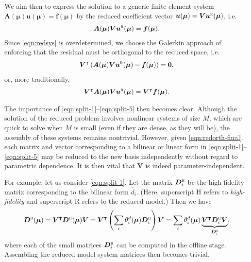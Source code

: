 \documentclass[onecolumn, twoside, a4paper, 11pt]{article}
\begin{document}
We aim then to express the solution to a generic finite element system
$\bm A(\bm \mu) \bm u(\bm \mu) = \bm f(\bm \mu)$ by the reduced
coefficient vector $\bm u(\bm \mu) = \bm V \bm u^\textsc{r}(\bm \mu)$, i.e.
\begin{equation}
  \label{eqn:redsys}
  \bm A(\bm \mu) \bm V \bm u^\textsc{r}(\bm \mu) = \bm f(\bm \mu).
\end{equation}
Since \eqref{eqn:redsys} is overdetermined, we choose the Galerkin
approach of enforcing that the residual must be orthogonal to the
reduced space, i.e.
\begin{equation}
  \label{eqn:redorth}
  \bm V^\intercal \left(
  \bm A(\bm \mu) \bm V \bm u^\textsc{r}(\bm \mu) - \bm f(\bm \mu)
  \right) = \bm 0,
\end{equation}
or, more traditionally,
\begin{equation}
  \label{eqn:redorth-final}
  \bm V^\intercal \bm A(\bm \mu) \bm V \bm u^\textsc{r}(\bm \mu) =
  \bm V^\intercal \bm f(\bm \mu).
\end{equation}

The importance of \eqref{eqn:split-1}--\eqref{eqn:split-5} then
becomes clear.  Although the solution of the reduced problem involves
nonlinear systems of size $M$, which are quick to solve when $M$ is
small (even if they are dense, as they will be), the assembly of these
systems remains nontrivial. However, given \eqref{eqn:redorth-final},
each matrix and vector corresponding to a bilinear or linear form in
\eqref{eqn:split-1}--\eqref{eqn:split-5} may be reduced to the new
basis independently without regard to parametric dependence. It is
then vital that $\bm V$ is indeed parameter-independent.

For example, let us consider \eqref{eqn:split-1}. Let the matrix
$\bm D^\textsc{h}_i$ be the high-fidelity matrix corresponding to the bilinear
form $\hat{d}_i$. (Here, superscript H refers to \emph{high-fidelity} and
superscript R refers to the reduced model.) Then we have
\begin{equation}
  \bm D^\textsc{r}(\bm \mu)
  = \bm V^\intercal \bm D^\textsc{h}(\bm \mu) \bm V
  = \bm V^\intercal \left( \sum_i \theta^d_i(\bm \mu) \bm D^\textsc{h}_i \right) \bm V
  = \sum_i \theta^d_i(\bm \mu) \underbrace{\bm V^\intercal \bm D^\textsc{h}_i \bm V}_{\bm D^\textsc{r}_i},
\end{equation}
where each of the small matrices $\bm D^\textsc{r}_i$ can be computed in the
offline stage. Assembling the reduced model system matrices then becomes
trivial.
\end{document}
